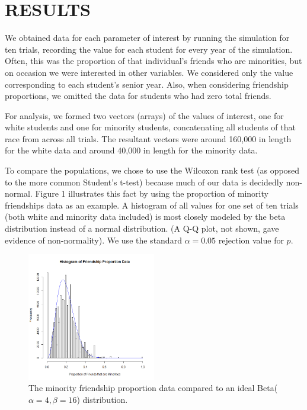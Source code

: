 
\section{RESULTS}
\label{sec:results}

We obtained data for each parameter of interest by running the simulation for
ten trials, recording the value for each student for every year of the
simulation. Often, this was the proportion of that individual's friends who
are minorities, but on occasion we were interested in other variables. We
considered only the value corresponding to each student's senior year. Also,
when considering friendship proportions, we omitted the data for students who
had zero total friends. 

For analysis, we formed two vectors (arrays) of the values of interest, one
for white students and one for minority students, concatenating all students
of that race from across all trials. The resultant vectors were around 160,000
in length for the white data and around 40,000 in length for the minority
data.

To compare the populations, we chose to use the Wilcoxon rank test (as opposed
to the more common Student's t-test) because much of our data is decidedly
non-normal. Figure 1 illustrates this fact by using the proportion of minority
friendships data as an example. A histogram of all values for one set of ten
trials (both white and minority data included) is most closely modeled by the
beta distribution instead of a normal distribution. (A Q-Q plot, not shown,
gave evidence of non-normality). We use the standard $\alpha=0.05$ rejection
value for $p$.

\begin{figure}[ht]
  \centering
    \includegraphics[width=0.5\textwidth]{histogramProportionData.png}
      \caption{The minority friendship proportion data compared to an ideal 
Beta($\alpha=4,\beta=16$) distribution.}
\end{figure}

